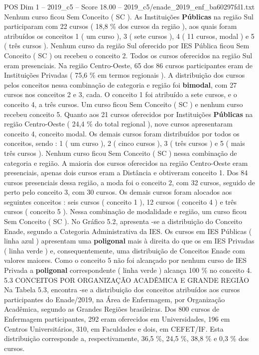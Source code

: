 \begin{textsample}{POS Dim 1 – 2019\_c5 – Score 18.00 – 2019\_c5/enade\_2019\_enf\_ba60297fd1.txt}
Nenhum curso ficou Sem Conceito ( SC ).
As Instituições \textbf{Públicas} na região Sul participaram com 22 cursos ( 18,8 \% dos cursos da região ), aos quais foram atribuídos os conceitos 1 ( um curso ), 3 ( sete cursos ), 4 ( 11 cursos, modal ) e 5 ( três cursos ).
Nenhum curso da região Sul oferecido por IES Pública ficou Sem Conceito ( SC ) ou recebeu o conceito 2.
Todos os cursos oferecidos na região Sul eram presenciais.
Na região Centro-Oeste, 65 dos 86 cursos participantes eram de Instituições Privadas ( 75,6 \% em termos regionais ).
A distribuição dos cursos pelos conceitos nessa combinação de categoria e região foi \textbf{bimodal}, com 27 cursos nos conceitos 2 e 3, cada.
O conceito 1 foi atribuído a sete cursos, e o conceito 4, a três cursos.
Um curso ficou Sem Conceito ( SC ) e nenhum curso recebeu conceito 5.
Quanto aos 21 cursos oferecidos por Instituições \textbf{Públicas} na região Centro-Oeste ( 24,4 \% do total regional ), nove cursos apresentaram conceito 4, conceito modal.
Os demais cursos foram distribuídos por todos os conceitos, sendo : 1 ( um curso ), 2 ( cinco cursos ), 3 ( três cursos ) e 5 ( mais três cursos ).
Nenhum curso ficou Sem Conceito ( SC ) nessa combinação de categoria e região.
A maioria dos cursos oferecidos na região Centro-Oeste eram presenciais, apenas dois cursos eram a Distância e obtiveram conceito 1.
Dos 84 cursos presenciais dessa região, a moda foi o conceito 2, com 32 cursos, seguido de perto pelo conceito 3, com 30 cursos.
Os demais cursos foram alocados aos seguintes conceitos : seis cursos ( conceito 1 ), 12 cursos ( conceito 4 ) e três cursos ( conceito 5 ).
Nessa combinação de modalidade e região, um curso ficou Sem Conceito ( SC ).
No Gráfico 5.2, apresenta -se a distribuição do Conceito Enade, segundo a Categoria Administrativa da IES.
Os cursos em IES Públicas ( linha azul ) apresentam uma \textbf{poligonal} mais à direita do que os em IES Privadas ( linha verde ) e, consequentemente, uma distribuição de Conceitos Enade com valores maiores.
Como o conceito 5 não foi alcançado por nenhum curso de IES Privada a \textbf{poligonal} correspondente ( linha verde ) alcança 100 \% no conceito 4. 5.3 CONCEITOS POR ORGANIZAÇÃO ACADÊMICA E GRANDE REGIÃO Na Tabela 5.3, encontra -se a distribuição dos conceitos atribuídos aos cursos participantes do Enade/2019, na Área de Enfermagem, por Organização Acadêmica, segundo as Grandes Regiões brasileiras.
Dos 800 cursos de Enfermagem participantes, 292 eram oferecidos em Universidades, 196 em Centros Universitários, 310, em Faculdades e dois, em CEFET/IF.
Esta distribuição corresponde a, respectivamente, 36,5 \%, 24,5 \%, 38,8 \% e 0,3 \% dos cursos.

\end{textsample}
